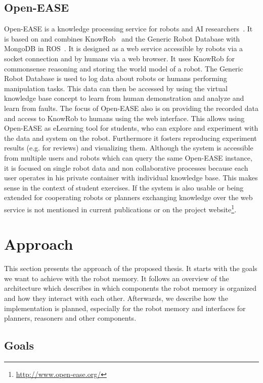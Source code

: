 \documentclass[a4paper,11pt]{article}
\begin{document}
\subsection{Open-EASE}
\label{sec:openease}
Open-EASE is a knowledge processing service for robots and AI
researchers~\cite{OpenEASE}. It is based on and combines
KnowRob~\cite{KnowRob} and the Generic Robot Database with MongoDB in
ROS~\cite{RoboDB}. It is designed as a web service accessible by
robots via a socket connection and by humans via a web browser. It
uses KnowRob for commonsense reasoning and storing the world model of
a robot. The Generic Robot Database is used to log data about robots
or humans performing manipulation tasks. This data can then be
accessed by using the virtual knowledge base concept to
learn from human demonstration and analyze and learn from faults. The
focus of Open-EASE also is on providing the recorded data and access
to KnowRob to humans using the web interface. This allows using
Open-EASE as eLearning tool for students, who can explore and
experiment with the data and system on the robot. Furthermore it
fosters reproducing experiment results (e.g. for reviews) and
visualizing them. Although the system is accessible from multiple
users and robots which can query the same Open-EASE instance, it is
focused on single robot data and non collaborative processes because
each user operates in his private container with individual knowledge
base. This makes sense in the context of student exercises. If the
system is also usable or being extended for cooperating robots or
planners exchanging knowledge over the web service is not mentioned in
current publications or on the project
website\footnote{\url{http://www.open-ease.org/}}.


\section{Approach}
\label{sec:approach}
This section presents the approach of the proposed thesis. It starts
with the goals we want to achieve with the robot memory.
It follows an overview of the
architecture which describes in which components the robot memory is
organized and how they interact with each other. Afterwards, we
describe how the implementation is planned, especially for the robot
memory and interfaces for planners, reasoners and other
components.

\subsection{Goals}
\label{sec:goals}
\end{document}

